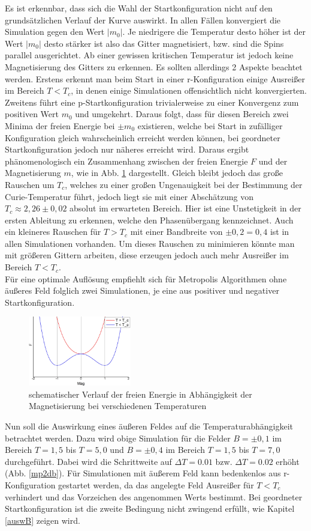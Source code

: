 Es ist erkennbar, dass sich die Wahl der Startkonfiguration nicht auf den grundsätzlichen Verlauf der Kurve auswirkt. In allen Fällen konvergiert die Simulation gegen den Wert $|m_0|$. Je niedrigere die Temperatur desto höher ist der Wert $|m_0|$ desto stärker ist also das Gitter magnetisiert, bzw. sind die Spins parallel ausgerichtet. Ab einer gewissen kritischen Temperatur ist jedoch keine Magnetisierung des Gitters zu erkennen. Es sollten allerdings 2 Aspekte beachtet werden. Erstens erkennt man beim Start in einer r-Konfiguration einige Ausreißer im Bereich $T<T_{c}$, in denen einige Simulationen offensichtlich nicht konvergierten. Zweitens führt eine p-Startkonfiguration trivialerweise zu einer Konvergenz zum positiven Wert $m_{0}$ und umgekehrt. Daraus folgt, dass für diesen Bereich zwei Minima der freien Energie bei $\pm m_{0}$ existieren, welche bei Start in zufälliger Konfiguration gleich wahrscheinlich erreicht werden können, bei geordneter Startkonfiguration jedoch nur näheres erreicht wird. Daraus ergibt phänomenologisch ein Zusammenhang zwischen der freien Energie $F$ und der Magnetisierung $m$, wie in Abb. \ref{fmagT} dargestellt. Gleich bleibt jedoch das große Rauschen um $T_{c}$, welches zu einer großen Ungenauigkeit bei der Bestimmung der Curie-Temperatur führt, jedoch liegt sie mit einer Abschätzung von $T_{c}\approx 2,26\pm 0,02$ absolut im erwarteten Bereich. Hier ist eine Unstetigkeit in der ersten Ableitung zu erkennen, welche den Phasenübergang kennzeichnet. Auch ein kleineres Rauschen für $T>T_{c}$ mit einer Bandbreite von $\pm 0,2 = 0,4$ ist in allen Simulationen vorhanden. Um dieses Rauschen zu minimieren könnte man mit größeren Gittern arbeiten, diese erzeugen jedoch auch mehr Ausreißer im Bereich $T<T_{c}$.\\
Für eine optimale Auflösung empfiehlt sich für Metropolis Algorithmen ohne äußeres Feld folglich zwei Simulationen, je eine aus positiver und negativer Startkonfiguration.
\begin{figure}[H]
	\centering
	\includegraphics[width=0.4\textwidth]{../Graph_Export/F(mag)_T.jpg}
	\caption{schematischer Verlauf der freien Energie in Abhängigkeit der Magnetisierung bei verschiedenen Temperaturen}
	\label{fmagT}
\end{figure}
Nun soll die Auswirkung eines äußeren Feldes auf die Temperaturabhängigkeit betrachtet werden. Dazu wird obige Simulation für die Felder $B=\pm 0,1$ im Bereich $T=1,5$ bis $T=5,0$ und $B=\pm 0,4$ im Bereich $T=1,5$ bis $T=7,0$ durchgeführt. Dabei wird die Schrittweite auf $\Delta T = 0.01$ bzw. $\Delta T = 0.02$ erhöht (Abb. \ref{mp2db}). Für Simulationen mit äußerem Feld kann bedenkenlos aus r-Konfiguration gestartet werden, da das angelegte Feld Ausreißer für $T<T_{c}$ verhindert und das Vorzeichen des angenommen Werts bestimmt. Bei geordneter Startkonfiguration ist die zweite Bedingung nicht zwingend erfüllt, wie Kapitel \ref{auswB} zeigen wird.


